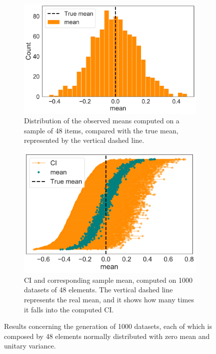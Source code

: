 \documentclass[twoside,onecolumn]{article}
\theoremstyle{definition}
\begin{document}
\begin{figure} \centering
\begin{subfigure}{0.5\textwidth}
         \includegraphics[width=\textwidth]{../figs/mean_distr_norm.pdf}
         \caption{Distribution of the observed means computed on a sample of 48 items, compared with the true mean, represented by the vertical dashed line.}\label{fig:mean_norm}
     \end{subfigure}
     \begin{subfigure}{0.45\textwidth}
         \includegraphics[width=\textwidth]{../figs/norm_mean_CI.pdf}
         \caption{CI and corresponding sample mean, computed on 1000 datasets of 48 elements. The vertical dashed line represents the real mean, and it shows how many times it falls into the computed CI.}\label{fig:meanci_norm}
     \end{subfigure}
  \caption{Results concerning the generation of 1000 datasets, each of which is composed by 48 elements normally distributed with zero mean and unitary variance.  }\label{fig:ci_norm_mean}
\end{figure}
\end{document}
